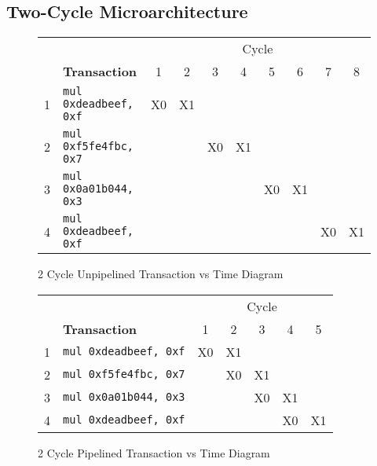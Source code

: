\documentclass[10pt]{article}
\begin{document}
\subsection{Two-Cycle Microarchitecture}
\begin{figure}[H]
\centering
\begin{tabular}{cl|c|c|c|c|c|c|c|c}
\hline
& & \multicolumn{8}{c}{Cycle} \\
& \textbf{Transaction} & 1 & 2 & 3 & 4 & 5 & 6 & 7 & 8\\
\hline
1 & \texttt{mul 0xdeadbeef, 0xf} & X0 & X1 & & & & & &\\
\hline
2 & \texttt{mul 0xf5fe4fbc, 0x7} & & & X0 & X1 & & & &\\
\hline
3 & \texttt{mul 0x0a01b044, 0x3} & & & & & X0 & X1 & &\\
\hline
4 & \texttt{mul 0xdeadbeef, 0xf} & & & & & & & X0 & X1\\
\hline
\end{tabular}
\caption{2 Cycle Unpipelined Transaction vs Time Diagram}
\label{fig:2cycunpipe_trans_diagram}
\end{figure}
\begin{figure}[H]
\centering
\begin{tabular}{cl|c|c|c|c|c}
\hline
& & \multicolumn{5}{c}{Cycle} \\
& \textbf{Transaction} & 1 & 2 & 3 & 4 & 5  \\
\hline
1 & \texttt{mul 0xdeadbeef, 0xf} & X0 & X1 & & & \\
\hline
2 & \texttt{mul 0xf5fe4fbc, 0x7} & & X0 & X1 & & \\
\hline
3 & \texttt{mul 0x0a01b044, 0x3} & & & X0 & X1 & \\
\hline
4 & \texttt{mul 0xdeadbeef, 0xf} & & & & X0 & X1 \\
\hline
\end{tabular}
\caption{2 Cycle Pipelined Transaction vs Time Diagram}
\label{fig:2cycpipe_trans_diagram}
\end{figure}
\end{document}
